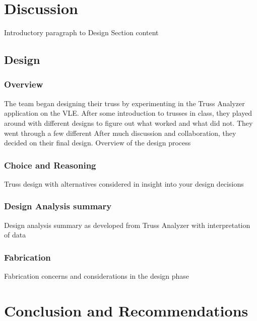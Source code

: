 \documentclass{article}
\let\Oldsection\section
\renewcommand{\section}{\FloatBarrier\Oldsection}
\let\Oldsubsection\subsection
\renewcommand{\subsection}{\FloatBarrier\Oldsubsection}
\let\Oldsubsubsection\subsubsection
\renewcommand{\subsubsection}{\FloatBarrier\Oldsubsubsection}
\begin{document}
  \newpage

  \section{Discussion}

  Introductory paragraph to Design Section content

  \subsection{Design}

  \subsubsection{Overview}

  The team began designing their truss by experimenting in the Truss Analyzer application on the VLE. After some introduction to trusses in class, they played around with different designs to figure out what worked and what did not. They went through a few different  After much discussion and collaboration, they decided on their final design.
  Overview of the design process

  \subsubsection{Choice and Reasoning}

  Truss design with alternatives considered in insight into your design decisions

  \subsubsection{Design Analysis summary}

  Design analysis summary as developed from Truss Analyzer with interpretation of data

  \subsubsection{Fabrication}

  Fabrication concerns and considerations in the design phase

  \newpage

  \section{Conclusion and Recommendations}
\end{document}
